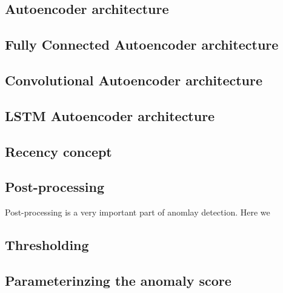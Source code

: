 \documentclass[12pt]{article}
\begin{document}
\subsection{Autoencoder architecture}
\subsection{Fully Connected Autoencoder architecture}
\subsection{Convolutional Autoencoder architecture}
\subsection{LSTM Autoencoder architecture}
\subsection{Recency concept}
\subsection{Post-processing}
Post-processing is a very important part of anomlay detection. Here we	
\subsection{Thresholding}
\subsection{Parameterinzing the anomaly score}
\end{document}
